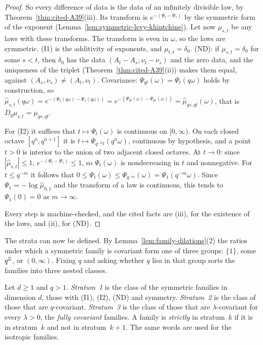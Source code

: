 \begin{proof}
So every difference of data is the data of an infinitely divisible law, by
Theorem~\ref{thm:cited-A39}(iii). Its transform is $e^{-(\Psi_t - \Psi_s)}$ by the symmetric form of the exponent (Lemma~\ref{lem:symmetric-levy-khintchine}). Let now
$\mu_{s,t}$ be any laws with these transforms. The transform is even in $\omega$, so the laws are
symmetric. (I1) is the additivity of exponents, and $\mu_{t,t} = \delta_0$. (ND): if
$\mu_{s,t} = \delta_0$ for some $s < t$, then $\delta_0$ has the data $(A_t - A_s, \nu_t - \nu_s)$
and the zero data, and the uniqueness of the triplet (Theorem~\ref{thm:cited-A39}(ii))
makes them equal, against $(A_s, \nu_s) \ne (A_t, \nu_t)$. Covariance:
$\Psi_{qt}(\omega) = \Psi_t(q\omega)$ holds by construction, so
$\widehat\mu_{s,t}(q\omega) = e^{-(\Psi_t(q\omega) - \Psi_s(q\omega))} = e^{-(\Psi_{qt}(\omega) -
\Psi_{qs}(\omega))} = \widehat\mu_{qs,qt}(\omega)$, that is $D_q\mu_{s,t} = \mu_{qs,qt}$.

For (I2) it suffices that $t \mapsto \Psi_t(\omega)$ is continuous on $[0,\infty)$. On each closed
octave $[q^n, q^{n+1}]$ it is $t \mapsto \Psi_{q^{-n}t}(q^n\omega)$, continuous by hypothesis, and
a point $t > 0$ is interior to the union of two adjacent closed octaves. At $t \to 0$: since
$|\widehat\mu_{s,t}| \le 1$, $e^{-(\Psi_t - \Psi_s)} \le 1$, so $\Psi_t(\omega)$ is nondecreasing
in $t$ and nonnegative. For $t \le q^{-m}$ it follows that
$0 \le \Psi_t(\omega) \le \Psi_{q^{-m}}(\omega) = \Psi_1(q^{-m}\omega)$. Since
$\Psi_1 = -\log\widehat\mu_{0,1}$ and the transform of a law is continuous, this tends to
$\Psi_1(0) = 0$ as $m \to \infty$.

Every step is machine-checked, and the cited facts are (iii), for the existence of the
laws, and (ii), for (ND).
\end{proof}

The strata can now be defined. By Lemma~\ref{lem:family-dilations}(2) the ratios under which a
symmetric family is covariant form one of three groups: $\{1\}$, some $q^{\mathbb{Z}}$, or $(0,\infty)$.
Fixing $q$ and asking whether $q$ lies in that group sorts the families into three nested classes.

\begin{definition}
\label{def:strata}

Let $d \ge 1$ and $q > 1$. \emph{Stratum~1} is the class of the symmetric families in dimension
$d$, those with (I1), (I2), (ND) and symmetry. \emph{Stratum~2} is the class of those that are
$q$-covariant. \emph{Stratum~3} is the class of those that are $\lambda$-covariant for every
$\lambda > 0$, the \emph{fully covariant} families. A family is \emph{strictly} in stratum~$k$ if it
is in stratum~$k$ and not in stratum~$k + 1$. The same words are used for the isotropic families.
\end{definition}

